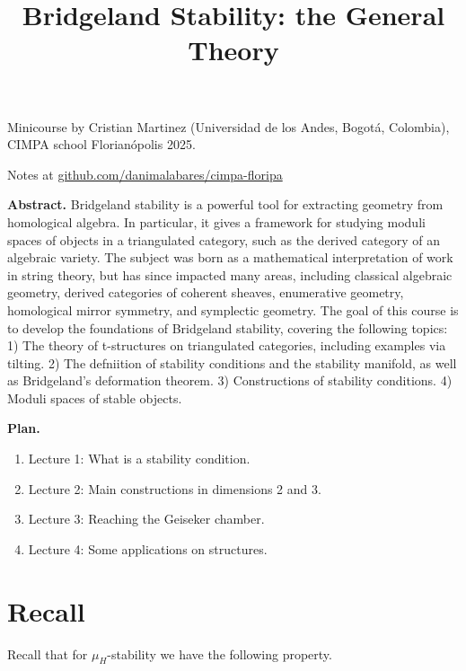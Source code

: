 


\title{Bridgeland Stability: the General
Theory}
\maketitle

Minicourse by Cristian Martinez (Universidad
de los Andes, Bogot\'a, Colombia), CIMPA
school
Florian\'opolis 2025.

Notes at
\href{%
http://github.com/danimalabares/cimpa-floripa
}{%
github.com/danimalabares/cimpa-floripa
}

\bigskip\noindent

{\bf Abstract.} Bridgeland stability is a
powerful tool for extracting geometry from
homological algebra. In particular, it gives
a framework for studying moduli spaces of
objects in a triangulated category, such as
the derived category of an algebraic variety.
The subject was born as a mathematical
interpretation of work in string theory, but
has since impacted many areas, including
classical algebraic geometry, derived
categories of coherent sheaves, enumerative
geometry, homological mirror symmetry, and
symplectic geometry. The goal of this course
is to develop the foundations of Bridgeland
stability, covering the following topics: 1)
The theory of t-structures on triangulated
categories, including examples via tilting.
2) The defniition of stability conditions and
the stability manifold, as well as
Bridgeland's deformation theorem. 3)
Constructions of stability conditions. 4)
Moduli spaces of stable objects.

\bigskip\noindent
\tableofcontents
\bigskip\noindent

\noindent
{\bf Plan.}
\begin{enumerate}
\item Lecture 1: What is a stability
condition.
\item Lecture 2: Main constructions in
dimensions 2 and 3.
\item Lecture 3: Reaching the Geiseker
chamber.
\item Lecture 4: Some applications on
structures.
\end{enumerate}

\section{Recall}
\label{section-recall}

Recall that for $\mu_H$-stability we have the
following property.

